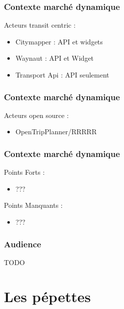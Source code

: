 \documentclass[table]{beamer}
\begin{document}
\begin{frame}
  \frametitle{Contexte marché dynamique}
  \begin{description}
    \item[Acteurs transit centric : ]
  \end{description}
  \begin{itemize}
    \item Citymapper : API et widgets 
    \item Waynaut  :  API et Widget
    \item Transport Api : API seulement
  \end{itemize}
\end{frame}

\begin{frame}
  \frametitle{Contexte marché dynamique}
  \begin{description}
    \item[Acteurs open source : ]
  \end{description}
  \begin{itemize}
    \item OpenTripPlanner/RRRRR
  \end{itemize}
\end{frame}

\begin{frame}
  \frametitle{Contexte marché dynamique}
  \begin{description}
    \item[Points Forts : ]
  \end{description}
  \begin{itemize}
    \item ???
  \end{itemize}
  \begin{description}
    \item[Points Manquants : ]
  \end{description}
  \begin{itemize}
    \item ???
  \end{itemize}
\end{frame}


\begin{frame}
  \frametitle{Audience}

  TODO
\end{frame}

\section{Les pépettes}
\end{document}
